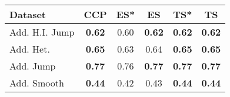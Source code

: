 \begin{tabular}{lccccc}
\toprule
Dataset & CCP & ES* & ES & TS* & TS \\
\midrule
Add. H.I. Jump & \textbf{0.62} & 0.60 & \textbf{0.62} & \textbf{0.62} & \textbf{0.62} \\
Add. Het. & \textbf{0.65} & 0.63 & 0.64 & \textbf{0.65} & \textbf{0.65} \\
Add. Jump & \textbf{0.77} & 0.76 & \textbf{0.77} & \textbf{0.77} & \textbf{0.77} \\
Add. Smooth & \textbf{0.44} & 0.42 & 0.43 & \textbf{0.44} & \textbf{0.44} \\
\bottomrule
\end{tabular}